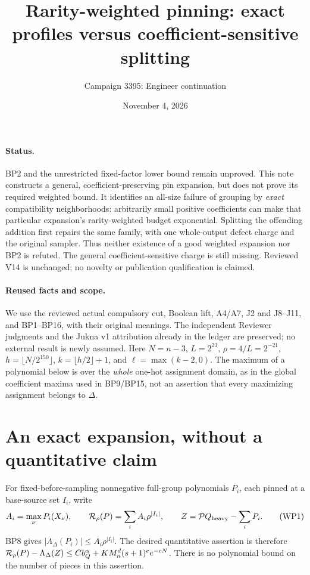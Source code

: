 \documentclass[11pt]{article}
\title{Rarity-weighted pinning: exact profiles versus coefficient-sensitive splitting}
\author{Campaign 3395: Engineer continuation}
\date{November 4, 2026}
\newcommand{\Pp}{\mathcal P}
\begin{document}
\maketitle

\paragraph{Status.}
BP2 and the unrestricted fixed-factor lower bound remain unproved.
This note constructs a general, coefficient-preserving pin expansion,
but does not prove its required weighted bound. It identifies an
all-size failure of grouping by \emph{exact} compatibility neighborhoods:
arbitrarily small positive coefficients can make that particular
expansion's rarity-weighted budget exponential.
Splitting the offending addition first repairs the same family, with
one whole-output defect charge and the original sampler.
Thus neither existence of a good weighted expansion nor BP2 is refuted.
The general coefficient-sensitive charge is still missing.
Reviewed V14 is unchanged; no novelty or publication qualification is claimed.

\paragraph{Reused facts and scope.}
We use the reviewed actual compulsory cut, Boolean lift, A4/A7,
J2 and J8--J11, and BP1--BP16, with their original meanings.
The independent Reviewer judgments and the Jukna v1 attribution already
in the ledger are preserved; no external result is newly assumed.
Here $N=n-3$, $L=2^{23}$, $\rho=4/L=2^{-21}$,
$h=\lfloor N/2^{150}\rfloor$, $k=\lfloor h/2\rfloor+1$,
and $\ell=\max(k-2,0)$.
The maximum of a polynomial below is over the \emph{whole} one-hot
assignment domain, as in the global coefficient maxima used in BP9/BP15,
not an assertion that every maximizing assignment belongs to $\Delta$.

\section{An exact expansion, without a quantitative claim}
For fixed-before-sampling nonnegative full-group polynomials $P_i$,
each pinned at a base-source set $I_i$, write
\[
 A_i=\max_\nu P_i(X_\nu),\qquad
 {\cal R}_\rho(P)=\sum_i A_i\rho^{|I_i|},\qquad
 Z=\Pp Q_{\rm heavy}-\sum_iP_i.                         \tag{WP1}
\]
BP8 gives $|\Lambda_\Delta(P_i)|\le A_i\rho^{|I_i|}$.
The desired quantitative assertion is therefore
${\cal R}_\rho(P)-\Lambda_\Delta(Z)\le
C b_Q^\alpha+K M_n^d(s+1)^e e^{-cN}$.
There is no polynomial bound on the number of pieces in this assertion.
\end{document}
